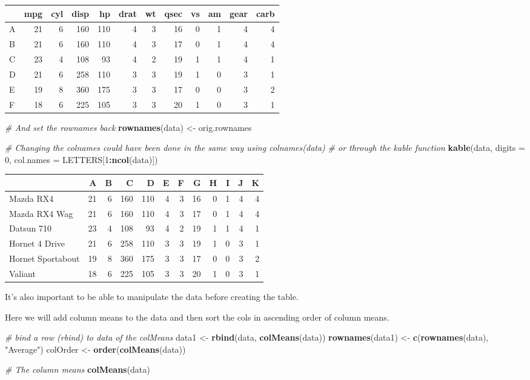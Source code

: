 \documentclass[]{article}
\newenvironment{Shaded}{\begin{snugshade}}{\end{snugshade}}
\newcommand{\KeywordTok}[1]{\textcolor[rgb]{0.13,0.29,0.53}{\textbf{#1}}}
\newcommand{\DataTypeTok}[1]{\textcolor[rgb]{0.13,0.29,0.53}{#1}}
\newcommand{\DecValTok}[1]{\textcolor[rgb]{0.00,0.00,0.81}{#1}}
\newcommand{\StringTok}[1]{\textcolor[rgb]{0.31,0.60,0.02}{#1}}
\newcommand{\CommentTok}[1]{\textcolor[rgb]{0.56,0.35,0.01}{\textit{#1}}}
\newcommand{\OperatorTok}[1]{\textcolor[rgb]{0.81,0.36,0.00}{\textbf{#1}}}
\newcommand{\NormalTok}[1]{#1}
\begin{document}
\begin{longtable}[]{@{}lrrrrrrrrrrr@{}}
\toprule
& mpg & cyl & disp & hp & drat & wt & qsec & vs & am & gear &
carb\tabularnewline
\midrule
\endhead
A & 21 & 6 & 160 & 110 & 4 & 3 & 16 & 0 & 1 & 4 & 4\tabularnewline
B & 21 & 6 & 160 & 110 & 4 & 3 & 17 & 0 & 1 & 4 & 4\tabularnewline
C & 23 & 4 & 108 & 93 & 4 & 2 & 19 & 1 & 1 & 4 & 1\tabularnewline
D & 21 & 6 & 258 & 110 & 3 & 3 & 19 & 1 & 0 & 3 & 1\tabularnewline
E & 19 & 8 & 360 & 175 & 3 & 3 & 17 & 0 & 0 & 3 & 2\tabularnewline
F & 18 & 6 & 225 & 105 & 3 & 3 & 20 & 1 & 0 & 3 & 1\tabularnewline
\bottomrule
\end{longtable}

\begin{Shaded}
\begin{Highlighting}[]
\CommentTok{# And set the rownames back}
\KeywordTok{rownames}\NormalTok{(data) <-}\StringTok{ }\NormalTok{orig.rownames}

\CommentTok{# Changing the colnames could have been done in the same way using colnames(data)}
\CommentTok{# or through the kable function}
\KeywordTok{kable}\NormalTok{(data, }\DataTypeTok{digits =} \DecValTok{0}\NormalTok{, }\DataTypeTok{col.names =}\NormalTok{ LETTERS[}\DecValTok{1}\OperatorTok{:}\KeywordTok{ncol}\NormalTok{(data)])}
\end{Highlighting}
\end{Shaded}

\begin{longtable}[]{@{}lrrrrrrrrrrr@{}}
\toprule
& A & B & C & D & E & F & G & H & I & J & K\tabularnewline
\midrule
\endhead
Mazda RX4 & 21 & 6 & 160 & 110 & 4 & 3 & 16 & 0 & 1 & 4 &
4\tabularnewline
Mazda RX4 Wag & 21 & 6 & 160 & 110 & 4 & 3 & 17 & 0 & 1 & 4 &
4\tabularnewline
Datsun 710 & 23 & 4 & 108 & 93 & 4 & 2 & 19 & 1 & 1 & 4 &
1\tabularnewline
Hornet 4 Drive & 21 & 6 & 258 & 110 & 3 & 3 & 19 & 1 & 0 & 3 &
1\tabularnewline
Hornet Sportabout & 19 & 8 & 360 & 175 & 3 & 3 & 17 & 0 & 0 & 3 &
2\tabularnewline
Valiant & 18 & 6 & 225 & 105 & 3 & 3 & 20 & 1 & 0 & 3 & 1\tabularnewline
\bottomrule
\end{longtable}

It's also important to be able to manipulate the data before creating
the table.

Here we will add column means to the data and then sort the cols in
ascending order of column means.

\begin{Shaded}
\begin{Highlighting}[]
\CommentTok{# bind a row (rbind) to data of the colMeans }
\NormalTok{data1 <-}\StringTok{ }\KeywordTok{rbind}\NormalTok{(data, }\KeywordTok{colMeans}\NormalTok{(data))}
\KeywordTok{rownames}\NormalTok{(data1) <-}\StringTok{ }\KeywordTok{c}\NormalTok{(}\KeywordTok{rownames}\NormalTok{(data), }\StringTok{"Average"}\NormalTok{)}
\NormalTok{colOrder <-}\StringTok{ }\KeywordTok{order}\NormalTok{(}\KeywordTok{colMeans}\NormalTok{(data))}

\CommentTok{# The column means}
\KeywordTok{colMeans}\NormalTok{(data)}
\end{Highlighting}
\end{Shaded}
\end{document}

